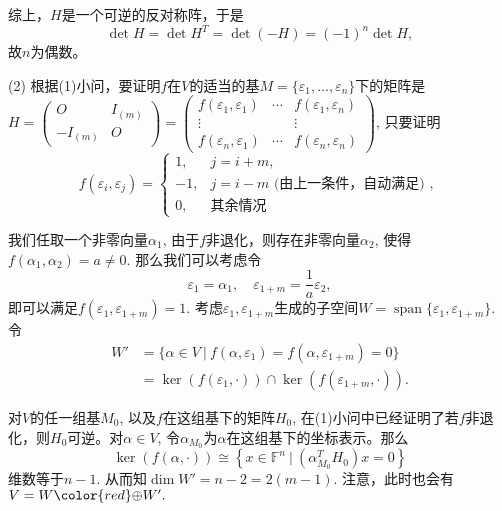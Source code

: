 综上，$H$是一个可逆的反对称阵，于是
$$\det H = \det H^T = \det (-H) = (-1)^n \det H,$$
故$n$为偶数。

(2) 根据(1)小问，要证明$f$在$V$的适当的基$M = \{ \varepsilon_1, \ldots, \varepsilon_n \}$下的矩阵是$H = \begin{pmatrix} O & I_{(m)} \\ -I_{(m)} & O \end{pmatrix} = \begin{pmatrix} f(\varepsilon_1, \varepsilon_1) & \cdots & f(\varepsilon_1, \varepsilon_n) \\ \vdots & & \vdots \\ f(\varepsilon_n, \varepsilon_1) & \cdots & f(\varepsilon_n, \varepsilon_n) \end{pmatrix}$, 只要证明
\begin{equation*}
f(\varepsilon_i, \varepsilon_j) = \begin{cases}
1, & j = i + m, \\
-1, & j = i - m \text{ (由上一条件，自动满足) }, \\
0, & \text{其余情况}
\end{cases}
\end{equation*}

我们任取一个非零向量$\alpha_1$, 由于$f$非退化，则存在非零向量$\alpha_2$, 使得$f(\alpha_1, \alpha_2) = a \neq 0$. 那么我们可以考虑令
$$\varepsilon_1 = \alpha_1, \quad \varepsilon_{1+m} = \dfrac{1}{a} \varepsilon_2,$$
即可以满足$f(\varepsilon_1, \varepsilon_{1+m}) = 1$. 考虑$\varepsilon_1, \varepsilon_{1+m}$生成的子空间$W = \operatorname{span} \{\varepsilon_1, \varepsilon_{1+m}\}$. 令
\begin{align*}
W' & = \{ \alpha \in V \ |\ f(\alpha, \varepsilon_1) = f(\alpha, \varepsilon_{1+m}) = 0 \} \\
& = \ker(f(\varepsilon_1, \cdot)) \cap \ker(f(\varepsilon_{1+m}, \cdot)).
\end{align*}

对$V$的任一组基$M_0$, 以及$f$在这组基下的矩阵$H_0$, 在(1)小问中已经证明了若$f$非退化，则$H_0$可逆。对$\alpha \in V$, 令$\alpha_{M_0}$为$\alpha$在这组基下的坐标表示。那么
$$\ker(f(\alpha, \cdot)) \cong \left\{x \in \mathbb{F}^n \ |\ \left( \alpha_{M_0}^T H_0 \right) x = 0 \right\}$$
维数等于$n - 1.$ 从而知$\dim W' = n-2 = 2(m-1)$. 注意，此时也会有$V = W {\color{red}\oplus} W'.$


